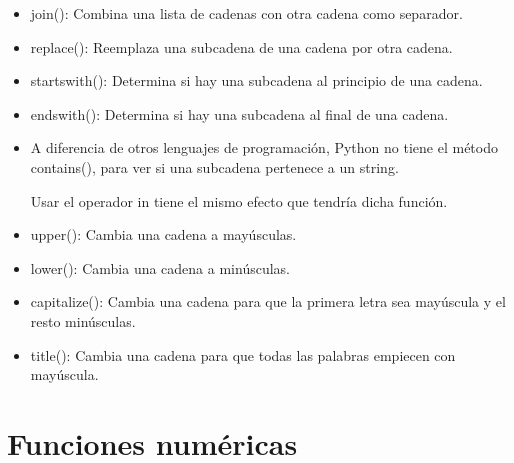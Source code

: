 \documentclass{report}
\begin{document}
\begin{itemize}
  \item join(): Combina una lista de cadenas con otra cadena como separador.
  

  \item replace(): Reemplaza una subcadena de una cadena por otra cadena.


  \item startswith(): Determina si hay una subcadena al principio de una cadena.


  \item endswith(): Determina si hay una subcadena al final de una cadena.
  

  \item A diferencia de otros lenguajes de programación, Python no tiene el método contains(), para ver si una subcadena pertenece a un string.\smallskip
  
  Usar el operador in tiene el mismo efecto que tendría dicha función.


  \item upper(): Cambia una cadena a mayúsculas.
  

  \item lower(): Cambia una cadena a minúsculas.
  

  \item capitalize(): Cambia una cadena para que la primera letra sea mayúscula y el resto minúsculas.

  
  \item title(): Cambia una cadena para que todas las palabras empiecen con mayúscula.
  

\end{itemize}

\section{Funciones numéricas}
\end{document}
